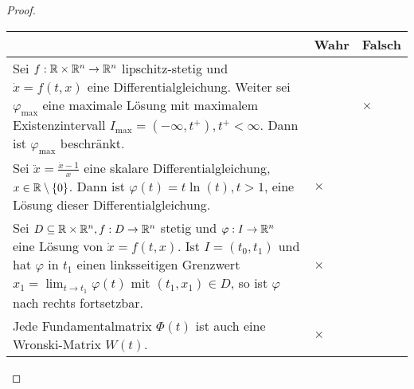 \begin{proof}\noindent
	
		\begin{tabularx}{\textwidth}{X|p{2cm}|p{2cm}|}
	& Wahr & Falsch \\\hline
	Sei $f : \mathbb{R} \times \mathbb{R}^n\to  \mathbb{R}^n$ lipschitz-stetig und $\dot{x} = f (t, x)$ eine Differentialgleichung.
	Weiter sei $\varphi_\text{max}$ eine maximale Lösung mit maximalem Existenzintervall	$I_\text{max} = (-\infty, t^+ ), t^+ < \infty$. Dann ist $\varphi_\text{max}$ beschränkt. & & $\times$ \\\hline
	Sei $\ddot{x} = \frac{\dot{x}-1}{x}$ eine skalare Differentialgleichung, $x \in \mathbb{R} \setminus \{0\}$. Dann ist $\varphi(t) = t \ln(t), t > 1$, eine Lösung dieser Differentialgleichung. & $\times$ & \\\hline
	Sei $D \subseteq \mathbb{R} \times \mathbb{R}^n , f : D \to \mathbb{R}^n$ stetig und $\varphi : I \to \mathbb{R}^n$ eine Lösung von $\dot{x} = f (t, x)$. Ist $I = (t_0, t_1)$ und hat $\varphi$ in $t_1$ einen linksseitigen Grenzwert $x_1 = \lim_{t\to t_1} \varphi(t)$ mit $(t_1 , x_1 ) \in D$, so ist $\varphi$ nach rechts fortsetzbar. & $\times$ & \\\hline
	Jede Fundamentalmatrix $\Phi(t)$ ist auch eine Wronski-Matrix $W(t)$. & $\times$ & \\\hline
\end{tabularx}
\end{proof}